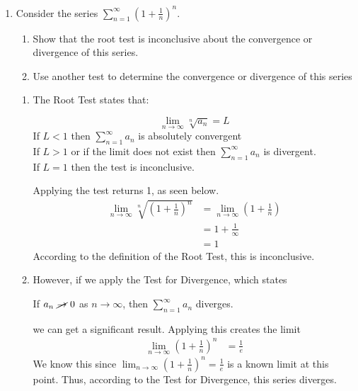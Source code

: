 \documentclass{article}
\begin{document}
\begin{enumerate}[label=\textbf{(12.\arabic*)}]


\item Consider the series $\displaystyle \sum_{n=1}^\infty \left(1+\frac{1}{n}\right)^n$.
\begin{enumerate}
\item Show that the root test is inconclusive about the convergence or divergence of this series.
\item Use another test to determine the convergence or divergence of this series
\end{enumerate}


\begin{enumerate}
\item The Root Test states that:
\begin{center}
\vspace{-20pt}
\[\lim_{n\to\infty} \sqrt[n]{a_n} = L\]
If $L<1$ then $\displaystyle \sum_{n=1}^\infty a_n$ is absolutely convergent\\
If $L>1$ or if the limit does not exist then $\displaystyle \sum_{n=1}^\infty a_n$ is divergent.\\
If $L=1$ then the test is inconclusive.
\end{center}
Applying the test returns 1, as seen below.
\begin{align*}
\lim_{n\to\infty} \sqrt[n]{\left(1+\frac{1}{n}\right)^n} &= \lim_{n\to\infty} \left(1+\frac{1}{n}\right)\\
&= 1+\frac{1}{\infty}\\
&= 1
\end{align*}
According to the definition of the Root Test, this is inconclusive.
\item However, if we apply the Test for Divergence, which states
\begin{center}
If $a_n\,\, \cancel{\rightarrow}\,\, 0$ as $n\to\infty$, then $\displaystyle \sum_{n=1}^\infty a_n$ diverges.
\end{center}
we can get a significant result. Applying this creates the limit
\begin{align*}
\lim_{n\to\infty} \left(1+\frac{1}{n}\right)^n &= \frac{1}{e}
\end{align*}
We know this since $\displaystyle \lim_{n\to\infty} \left(1+\frac{1}{n}\right)^n = \frac{1}{e}$ is a known limit at this point. Thus, according to the Test for Divergence, this series diverges.
\end{enumerate}


\end{enumerate}
\end{document}
